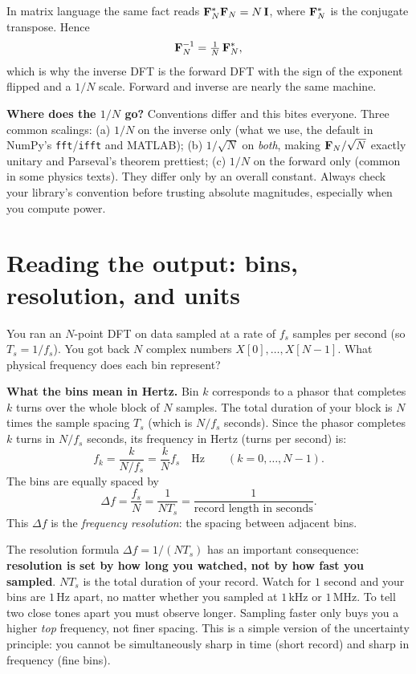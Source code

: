 In matrix language the same fact reads $\mathbf{F}_N^{*} \mathbf{F}_N = N\,\mathbf{I}$,
where $\mathbf{F}_N^{*}$ is the conjugate transpose. Hence
\[
\mathbf{F}_N^{-1} = \tfrac{1}{N}\,\mathbf{F}_N^{*},
\]
which is why the inverse DFT is the forward DFT with the sign of the exponent
flipped and a $1/N$ scale. Forward and inverse are nearly the same machine.

\begin{trapbox}
\textbf{Where does the $1/N$ go?} Conventions differ and this bites everyone.
Three common scalings: (a) $1/N$ on the inverse only (what we use, the default in
NumPy's \texttt{fft}/\texttt{ifft} and MATLAB); (b) $1/\sqrt{N}$ on \emph{both},
making $\mathbf{F}_N/\sqrt{N}$ exactly unitary and Parseval's theorem prettiest; (c)
$1/N$ on the forward only (common in some physics texts). They differ only by an
overall constant. Always check your library's convention before trusting absolute
magnitudes, especially when you compute power.
\end{trapbox}

\section{Reading the output: bins, resolution, and units}
\label{ch08:reading}

You ran an $N$-point DFT on data sampled at a rate of $f_s$ samples per second (so $T_s = 1/f_s$). You got back $N$ complex numbers $X[0], \dots, X[N-1]$. What physical frequency does each bin represent?

\textbf{What the bins mean in Hertz.} Bin $k$ corresponds to a phasor that completes $k$ turns over the whole block of $N$ samples. The total duration of your block is $N$ times the sample spacing $T_s$ (which is $N/f_s$ seconds). Since the phasor completes $k$ turns in $N/f_s$ seconds, its frequency in Hertz (turns per second) is:
\[
f_k = \frac{k}{N/f_s} = \frac{k}{N} f_s \quad\text{Hz} \qquad (k = 0,\dots,N-1).
\]
The bins are equally spaced by
\[
\Delta f = \frac{f_s}{N} = \frac{1}{N T_s} = \frac{1}{\text{record length in seconds}}.
\]
This $\Delta f$ is the \emph{frequency resolution}: the spacing between adjacent bins.

\begin{happeningbox}
The resolution formula $\Delta f = 1/(NT_s)$ has an important consequence:
\textbf{resolution is set by how long you watched, not by how fast you
sampled}. $NT_s$ is the total duration of your record. Watch for $1$ second and
your bins are $1$\,Hz apart, no matter whether you sampled at $1$\,kHz or
$1$\,MHz. To tell two close tones apart you must observe longer. Sampling faster
only buys you a higher \emph{top} frequency, not finer spacing. This is a simple
version of the uncertainty principle: you cannot be simultaneously sharp in time
(short record) and sharp in frequency (fine bins).
\end{happeningbox}

